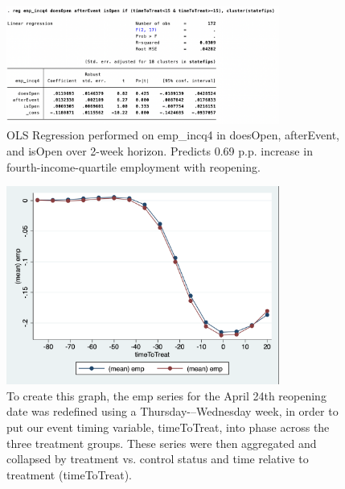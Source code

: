 \documentclass[12pt,letterpaper]{article}
\begin{document}
        \begin{figure}[!ht]
          \centering
          \includegraphics[width=0.8\textwidth]{figures/emp_incq4.png}
\caption{OLS Regression performed on emp\_incq4 in doesOpen, afterEvent, and isOpen over 2-week horizon.  Predicts 0.69 p.p. increase in fourth-income-quartile employment with reopening.}
          \label{fig:figures-emp_incq4-png}
        \end{figure}
        \begin{figure}[!ht]
          \centering
          \includegraphics[width=0.8\textwidth]{figures/emp_graph.png}
\caption{To create this graph, the emp series for the April 24th reopening date was redefined using a Thursday-–Wednesday week, in order to put our event timing variable, timeToTreat, into phase across the three treatment groups.  These series were then aggregated and collapsed by treatment vs. control status and time relative to treatment (timeToTreat).}
          \label{fig:figures-emp_graph-png}
        \end{figure}
        \clearpage
\end{document}
